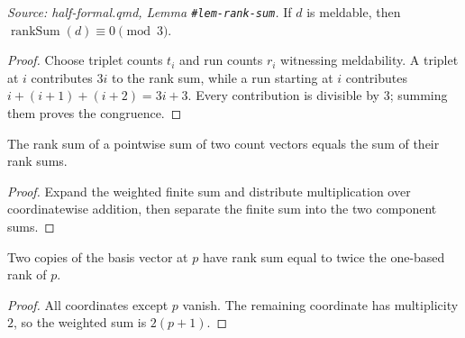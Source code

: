 \begin{lemma}
  \label{lem:meldable_rank_sum}
  \textit{Source: half-formal.qmd, Lemma \texttt{\#lem-rank-sum}.}
  If \(d\) is meldable, then
  \(\operatorname{rankSum}(d)\equiv0\pmod3\).
\end{lemma}
\begin{proof}

\leanok
  Choose triplet counts \(t_i\) and run counts \(r_i\) witnessing
  meldability.  A triplet at \(i\) contributes \(3i\) to the rank sum,
  while a run starting at \(i\) contributes
  \(i+(i+1)+(i+2)=3i+3\).  Every contribution is divisible by \(3\);
  summing them proves the congruence.
\end{proof}

\begin{lemma}

  \label{lem:rankSum_add}
  The rank sum of a pointwise sum of two count vectors equals the sum of
  their rank sums.
\end{lemma}
\begin{proof}

\leanok
  Expand the weighted finite sum and distribute multiplication over
  coordinatewise addition, then separate the finite sum into the two
  component sums.
\end{proof}

\begin{lemma}

  \label{lem:rankSum_two_basis}
  Two copies of the basis vector at \(p\) have rank sum equal to twice the
  one-based rank of \(p\).
\end{lemma}
\begin{proof}

\leanok
  All coordinates except \(p\) vanish.  The remaining coordinate has
  multiplicity \(2\), so the weighted sum is \(2(p+1)\).
\end{proof}

